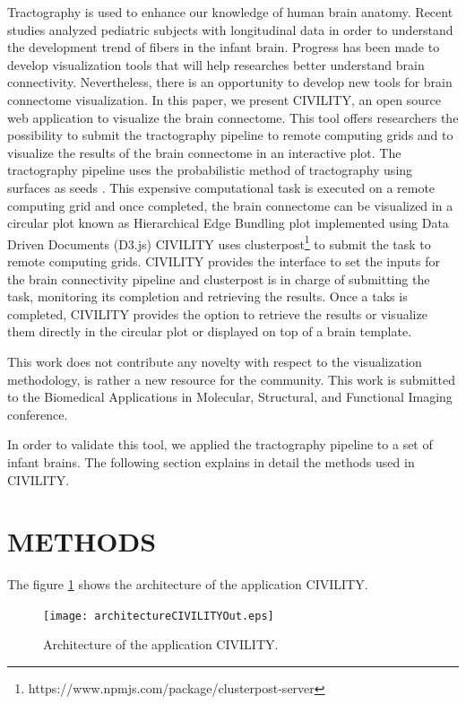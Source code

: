 \documentclass[]{spie}  %
\begin{document}
Tractography is used to enhance our knowledge of human brain anatomy. Recent studies analyzed pediatric subjects with longitudinal data
in order to understand the development trend of fibers in the infant brain\cite{10.1371/journal.pone.0024678}. 
Progress has been made to develop visualization tools that will help researches better understand brain connectivity\cite{10.1371/journal.pone.0068910}. 
Nevertheless, there is an opportunity to develop new tools for brain connectome visualization.
In this paper, we present CIVILITY, an open source web application to visualize the brain connectome.  
This tool offers researchers the possibility to submit the tractography pipeline to remote computing grids 
and to visualize the results of the brain connectome in an interactive plot.
The tractography pipeline uses the probabilistic method of tractography using surfaces as seeds \cite{Behrens2007144}\cite{MRM:MRM10609}. 
This expensive computational task is executed on a remote computing grid and once completed, the brain connectome can be visualized 
in a circular plot known as Hierarchical Edge Bundling plot implemented using Data Driven Documents (D3.js)
CIVILITY uses clusterpost\footnote{https://www.npmjs.com/package/clusterpost-server} to submit the task to remote computing grids. 
CIVILITY provides the interface to set the inputs for the brain connectivity pipeline and clusterpost 
is in charge of submitting the task, monitoring its completion and retrieving the results. 
Once a taks is completed, CIVILITY provides the option to retrieve the results or visualize them directly in the circular plot
or displayed on top of a brain template. 

This work does not contribute any novelty with respect to the visualization methodology, is rather a new resource for the community.
This work is submitted to the Biomedical Applications in Molecular, Structural, and Functional Imaging conference. 

In order to validate this tool, we applied the tractography pipeline to a set of infant brains. 
The following section explains in detail the methods used in CIVILITY.

\section{METHODS} 
\label{sec:METHODS}

The figure \ref{fig:architectureCIVILITY} shows the architecture of the application CIVILITY. 

\begin{figure}
\centering 
\texttt{[image: architectureCIVILITYOut.eps]}
\caption[Architecture of the application CIVILITY]{Architecture of the application CIVILITY. }
\label{fig:architectureCIVILITY}
\end{figure}
\end{document}
